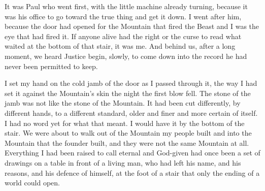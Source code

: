 It was Paul who went first, with the little machine already turning, because it was his office to go toward the true thing and get it down. I went after him, because the door had opened for the Mountain that fired the Beast and I was the eye that had fired it. If anyone alive had the right or the curse to read what waited at the bottom of that stair, it was me. And behind us, after a long moment, we heard Justice begin, slowly, to come down into the record he had never been permitted to keep.\par

I set my hand on the cold jamb of the door as I passed through it, the way I had set it against the Mountain's skin the night the first blow fell. The stone of the jamb was not like the stone of the Mountain. It had been cut differently, by different hands, to a different standard, older and finer and more certain of itself. I had no word yet for what that meant. I would have it by the bottom of the stair. We were about to walk out of the Mountain my people built and into the Mountain that the founder built, and they were not the same Mountain at all. Everything I had been raised to call eternal and God-given had once been a set of drawings on a table in front of a living man, who had left his name, and his reasons, and his defence of himself, at the foot of a stair that only the ending of a world could open.\par
